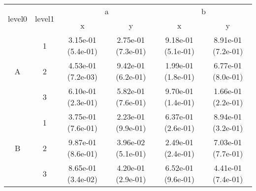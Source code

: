\begin{tabular}{cccccc}
\toprule
\multirow{2}{*}{level0} & \multirow{2}{*}{level1}&\multicolumn{2}{c}{a}&\multicolumn{2}{c}{b}\tabularnewline
\cmidrule(lr){3-4}
\cmidrule(lr){5-6}
&&x&y&x&y\tabularnewline
\midrule
\multirow{3}{*}{A}&1& 3.15e-01 (5.4e-01)& 2.75e-01 (7.3e-01)& 9.18e-01 (5.1e-01)& 8.91e-01 (7.2e-01)\tabularnewline
&2& 4.53e-01 (7.2e-03)& 9.42e-01 (6.2e-01)& 1.99e-01 (1.8e-01)& 6.77e-01 (8.0e-01)\tabularnewline
&3& 6.10e-01 (2.3e-01)& 5.82e-01 (7.6e-01)& 9.70e-01 (1.4e-01)& 1.66e-01 (2.2e-01)\tabularnewline
\midrule
\multirow{3}{*}{B}&1& 3.75e-01 (7.6e-01)& 2.23e-01 (9.9e-01)& 6.37e-01 (2.6e-01)& 8.94e-01 (3.2e-01)\tabularnewline
&2& 9.87e-01 (8.6e-01)& 3.96e-02 (5.1e-01)& 2.49e-01 (2.4e-01)& 7.03e-01 (7.7e-01)\tabularnewline
&3& 8.65e-01 (3.4e-02)& 4.20e-01 (2.9e-01)& 6.52e-01 (9.6e-01)& 4.41e-01 (7.4e-01)\tabularnewline
\bottomrule
\end{tabular}
